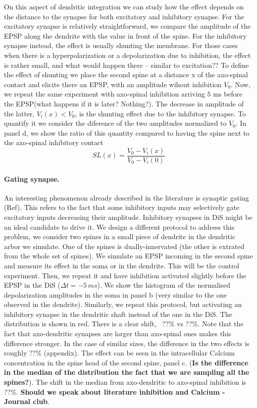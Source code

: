 \documentclass[10pt,letterpaper]{article}
\begin{document}
On this aspect of dendritic integration we can study how the effect depends on the distance to the synapse for both excitatory and inhibitory synapse. For the excitatory synapse is relatively straightforward, we compare the amplitude of the EPSP along the dendrite with the value in front of the spine. For the inhibitory synapse instead, the effect is usually shunting the membrane. For those cases when there is a hyperpolarization or a depolarization due to inhibition, the effect is rather small, and what would happen there -- similar to excitation?? To define the effect of shunting we place the second spine at a distance x of the axo-spinal contact and elicite there an EPSP, with an amplitude  wihout inhibition $V_0$. Now, we repeat the same experiment with axo-spinal inhibition arriving $5$ ms before the EPSP(what happens if it is later? Nothing?). The decrease in amplitude of the latter, $V_{i}(x)<V_0$, is the shunting effect due to the inhibitory synapse. To quantify it we consider the diference of the two amplitudes normalized to $V_0$. In panel d, we show the ratio of this quantity compared to having the spine next to the axo-spinal inhibitory contact
\[ SL(x) = \frac{V_0-V_i(x)}{V_0-V_i(0)}
\]


\paragraph*{Gating synapse.} An interesting phenomenon already described in the literature is synaptic gating (Ref). This refers to the fact that some inhibitory inputs may selectively gate excitatory inputs decreasing their amplitude. Inhibitory synapses in DiS might be an ideal candidate to drive it. We design a different protocol to address this problem, we consider two spines in a small piece of dendrite in the dendritic arbor we simulate. One of the spines is dually-innervated (the other is extrated from the whole set of spines). We simulate an EPSP incoming in the second spine and measure its effect in the soma or in the dendrite. This will be the control experiment. Then, we repeat it and have inhibition activated slightly before the EPSP in the DiS ($\Delta t =-5\,ms$). We show the histogram of the normalised depolarization amplitudes in the soma in panel b (very similar to the one observed in the dendrite). Similarly, we repeat this protocol, but activating an inhibitory synapse in the dendritic shaft instead of the one in the DiS. The distribution is shown in red. There is a clear shift, ~??$\%$ vs ??$\%$. Note that the fact that axo-dendritic synapses are larger than axo-spinal ones makes this difference stronger. In the case of similar sizes, the difference in the two effects is roughly ??$\%$ (appendix). The effect can be seen in the intracellular Calcium concentration in the spine head of the second spine, panel c. ({\bf Is the difference in the median of the distribution the fact that we are sampling all the spines?}). The shift in the median from axo-dendritic to axo-spinal inhibition is ??$\%$. {\bf Should we speak about literature inhibition and Calcium - Journal club}.
\end{document}
